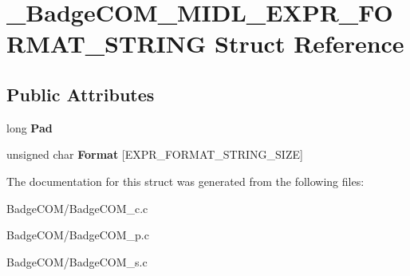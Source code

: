 \hypertarget{struct___badge_c_o_m___m_i_d_l___e_x_p_r___f_o_r_m_a_t___s_t_r_i_n_g}{\section{\-\_\-\-Badge\-C\-O\-M\-\_\-\-M\-I\-D\-L\-\_\-\-E\-X\-P\-R\-\_\-\-F\-O\-R\-M\-A\-T\-\_\-\-S\-T\-R\-I\-N\-G Struct Reference}
\label{struct___badge_c_o_m___m_i_d_l___e_x_p_r___f_o_r_m_a_t___s_t_r_i_n_g}
}
\subsection*{Public Attributes}
\begin{DoxyCompactItemize}
\item 
\hypertarget{struct___badge_c_o_m___m_i_d_l___e_x_p_r___f_o_r_m_a_t___s_t_r_i_n_g_ac56a13c7af18aee2959c6190a5f6698e}{long {\bfseries Pad}}\label{struct___badge_c_o_m___m_i_d_l___e_x_p_r___f_o_r_m_a_t___s_t_r_i_n_g_ac56a13c7af18aee2959c6190a5f6698e}

\item 
\hypertarget{struct___badge_c_o_m___m_i_d_l___e_x_p_r___f_o_r_m_a_t___s_t_r_i_n_g_a5f770f30f6a83cefe8a85ecc2bbf4dda}{unsigned char {\bfseries Format} \mbox{[}E\-X\-P\-R\-\_\-\-F\-O\-R\-M\-A\-T\-\_\-\-S\-T\-R\-I\-N\-G\-\_\-\-S\-I\-Z\-E\mbox{]}}\label{struct___badge_c_o_m___m_i_d_l___e_x_p_r___f_o_r_m_a_t___s_t_r_i_n_g_a5f770f30f6a83cefe8a85ecc2bbf4dda}

\end{DoxyCompactItemize}


The documentation for this struct was generated from the following files\-:\begin{DoxyCompactItemize}
\item 
Badge\-C\-O\-M/Badge\-C\-O\-M\-\_\-c.\-c\item 
Badge\-C\-O\-M/Badge\-C\-O\-M\-\_\-p.\-c\item 
Badge\-C\-O\-M/Badge\-C\-O\-M\-\_\-s.\-c\end{DoxyCompactItemize}
